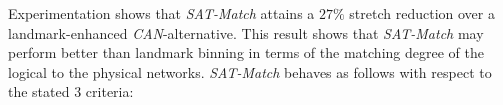 Experimentation shows that \emph{SAT-Match} 
attains a $27\%$ stretch reduction over 
a landmark-enhanced \emph{CAN}-alternative.
This result shows that \emph{SAT-Match} 
may perform better than landmark binning in terms of the matching degree
of the logical to the physical networks.
\emph{SAT-Match} behaves as follows with respect to the stated $3$ criteria:
%
%
%
%
